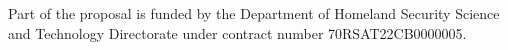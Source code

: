 Part of the proposal is funded by the Department of Homeland Security Science and Technology Directorate under contract number 70RSAT22CB0000005. 